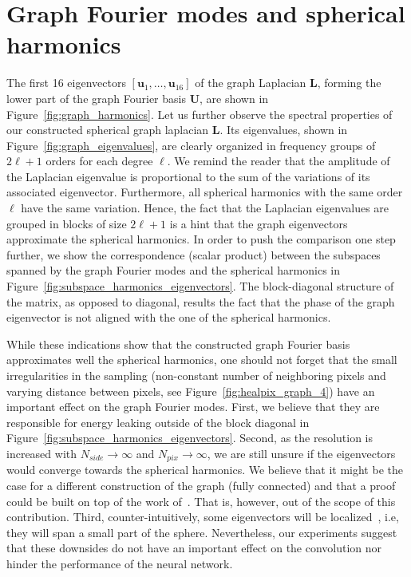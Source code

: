 \documentclass[final,twocolumn,3p,times,authoryear]{elsarticle}
\newcommand{\figref}[1]{Figure~\ref{fig:#1}}
\renewcommand{\b}[1]{{\bm{#1}}}   %
\newcommand{\1}{\b{1}}              %
\newcommand{\0}{\b{0}}              %
\renewcommand{\L}{\b{L}}
\newcommand{\U}{\b{U}}
\begin{document}
\section{Graph Fourier modes and spherical harmonics}
\label{sec:comparison_spherical_harmonics}
The first 16 eigenvectors $[\b u_1, \ldots, \b u_{16}]$ of the graph Laplacian $\L$, forming the lower part of the graph Fourier basis $\U$, are shown in \figref{graph_harmonics}.
Let us further observe the spectral properties of our constructed spherical graph laplacian $\L$.
Its eigenvalues, shown in \figref{graph_eigenvalues}, are clearly organized in frequency groups of $2\ell + 1$ orders for each degree $\ell$.
We remind the reader that the amplitude of the Laplacian eigenvalue is proportional to the sum of the variations of its associated eigenvector. Furthermore, all spherical harmonics with the same order $\ell$ have the same variation. Hence, the fact that the Laplacian eigenvalues are grouped in blocks of size $2\ell + 1$ is a hint that the graph eigenvectors approximate the spherical harmonics.
In order to push the comparison one step further, we show the correspondence (scalar product) between the subspaces spanned by the graph Fourier modes and the spherical harmonics in \figref{subspace_harmonics_eigenvectors}.
The block-diagonal structure of the matrix, as opposed to diagonal, results the fact that the phase of the graph eigenvector is not aligned with the one of the spherical harmonics.

While these indications show that the constructed graph Fourier basis approximates well the spherical harmonics, one should not forget that the small irregularities in the sampling (non-constant number of neighboring pixels and varying distance between pixels, see \figref{healpix_graph_4}) have an important effect on the graph Fourier modes.
First, we believe that they are responsible for energy leaking outside of the block diagonal in \figref{subspace_harmonics_eigenvectors}.
Second, as the resolution is increased with $N_{side} \rightarrow \infty$ and $N_{pix} \rightarrow \infty$, we are still unsure if the eigenvectors would converge towards the spherical harmonics. We believe that it might be the case for a different construction of the graph (fully connected) and that a proof could be built on top of the work of~\cite{belkin2007convergence}. That is, however, out of the scope of this contribution.
Third, counter-intuitively, some eigenvectors will be localized~\citep{perraudin2018global}, i.e, they will span a small part of the sphere.
Nevertheless, our experiments suggest that these downsides do not have an important effect on the convolution nor hinder the performance of the neural network.
\end{document}
